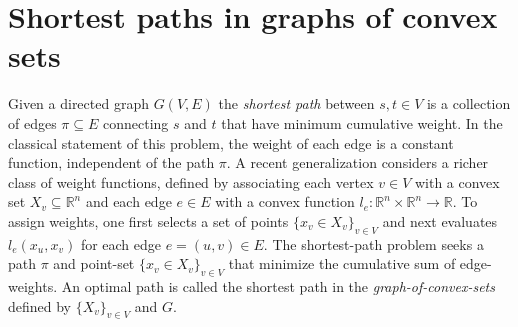 \documentclass[letterpaper, 11pt]{article}
\begin{document}
%


\section{Shortest paths in graphs of convex sets}
Given a directed graph $G(V, E)$ the \emph{shortest path} between $s, t \in V$
is a collection of edges $\pi \subseteq E$ connecting $s$ and $t$ that have minimum cumulative weight.
In the classical statement of this problem, the weight
of each edge is a constant function, independent of the path $\pi$. 
A recent generalization considers a richer class of weight functions,
defined by associating each vertex $v \in V$ with a convex set $X_v \subseteq \mathbb{R}^n$ 
and each  edge $e \in E$ with a convex function 
$l_e : \mathbb{R}^n \times \mathbb{R}^n \rightarrow \mathbb{R}$.
To assign weights, one first selects a set of points $\{x_v \in X_v\}_{v \in V}$
and next evaluates $l_e(x_{u}, x_{v})$ for each edge $e = (u, v) \in E$.
The shortest-path problem seeks a path $\pi$ and point-set $\{x_v \in X_v\}_{v \in V}$ that minimize
the cumulative sum of edge-weights.  An optimal path is called the shortest path in the \emph{graph-of-convex-sets} 
defined by $\{X_v\}_{v\in V}$ and $G$.
\end{document}
